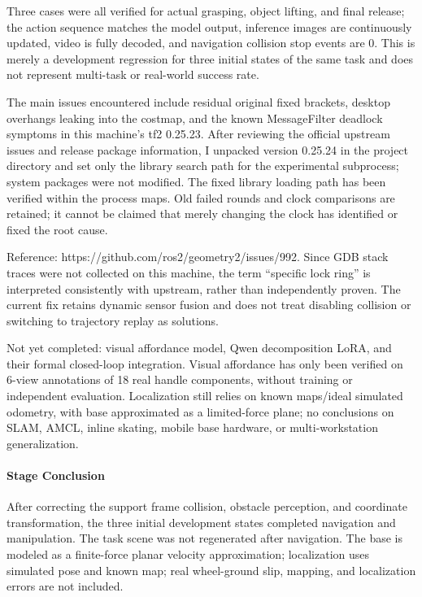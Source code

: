 Three cases were all verified for actual grasping, object lifting, and final release; the action sequence matches the model output, inference images are continuously updated, video is fully decoded, and navigation collision stop events are 0. This is merely a development regression for three initial states of the same task and does not represent multi-task or real-world success rate.

The main issues encountered include residual original fixed brackets, desktop overhangs leaking into the costmap, and the known MessageFilter deadlock symptoms in this machine's tf2 0.25.23. After reviewing the official upstream issues and release package information, I unpacked version 0.25.24 in the project directory and set only the library search path for the experimental subprocess; system packages were not modified. The fixed library loading path has been verified within the process maps. Old failed rounds and clock comparisons are retained; it cannot be claimed that merely changing the clock has identified or fixed the root cause.

Reference: https://github.com/ros2/geometry2/issues/992. Since GDB stack traces were not collected on this machine, the term ``specific lock ring'' is interpreted consistently with upstream, rather than independently proven. The current fix retains dynamic sensor fusion and does not treat disabling collision or switching to trajectory replay as solutions.

Not yet completed: visual affordance model, Qwen decomposition LoRA, and their formal closed-loop integration. Visual affordance has only been verified on 6-view annotations of 18 real handle components, without training or independent evaluation. Localization still relies on known maps/ideal simulated odometry, with base approximated as a limited-force plane; no conclusions on SLAM, AMCL, inline skating, mobile base hardware, or multi-workstation generalization.



\paragraph{Stage Conclusion} After correcting the support frame collision, obstacle perception, and coordinate transformation, the three initial development states completed navigation and manipulation. The task scene was not regenerated after navigation. The base is modeled as a finite-force planar velocity approximation; localization uses simulated pose and known map; real wheel-ground slip, mapping, and localization errors are not included.


